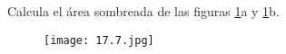 Calcula el área sombreada de las figuras \ref{fig:17.7}a y \ref{fig:17.7}b.

\begin{figure}[H]
    \centering
    \texttt{[image: 17.7.jpg]}
    \label{fig:17.7}
\end{figure}
